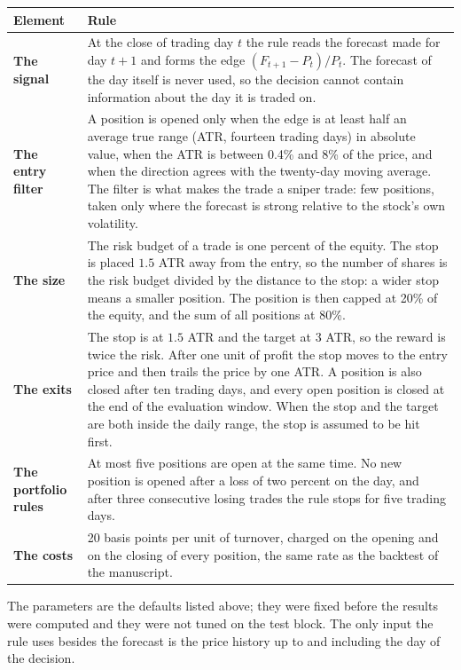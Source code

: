 \documentclass[11pt,a4paper]{article}
\begin{document}
\begin{center}\small
\begin{tabular}{p{}p{}}
\toprule
Element & Rule \\
\midrule
\textbf{The signal} & At the close of trading day $t$ the rule reads the forecast made for day $t+1$ and forms the edge $(F_{t+1}-P_t)/P_t$. The forecast of the day itself is never used, so the decision cannot contain information about the day it is traded on. \\
\textbf{The entry filter} & A position is opened only when the edge is at least half an average true range (ATR, fourteen trading days) in absolute value, when the ATR is between 0.4\% and 8\% of the price, and when the direction agrees with the twenty-day moving average. The filter is what makes the trade a sniper trade: few positions, taken only where the forecast is strong relative to the stock's own volatility. \\
\textbf{The size} & The risk budget of a trade is one percent of the equity. The stop is placed $1.5$ ATR away from the entry, so the number of shares is the risk budget divided by the distance to the stop: a wider stop means a smaller position. The position is then capped at 20\% of the equity, and the sum of all positions at 80\%. \\
\textbf{The exits} & The stop is at $1.5$ ATR and the target at $3$ ATR, so the reward is twice the risk. After one unit of profit the stop moves to the entry price and then trails the price by one ATR. A position is also closed after ten trading days, and every open position is closed at the end of the evaluation window. When the stop and the target are both inside the daily range, the stop is assumed to be hit first. \\
\textbf{The portfolio rules} & At most five positions are open at the same time. No new position is opened after a loss of two percent on the day, and after three consecutive losing trades the rule stops for five trading days. \\
\textbf{The costs} & 20 basis points per unit of turnover, charged on the opening and on the closing of every position, the same rate as the backtest of the manuscript. \\
\bottomrule
\end{tabular}
\end{center}

The parameters are the defaults listed above; they were fixed before the results
were computed and they were not tuned on the test block. The only input the rule
uses besides the forecast is the price history up to and including the day of
the decision.
\end{document}
